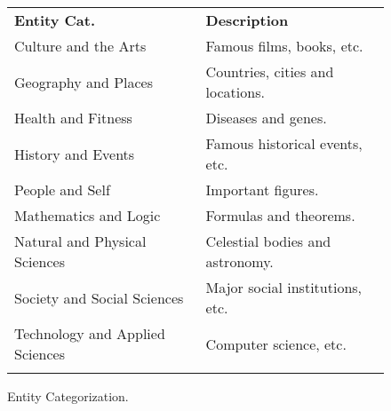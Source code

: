 

\begin{figure}[!b]
\vspace{-3mm}
\renewcommand{\arraystretch}{1.0}
\setlength{\tabcolsep}{2pt}
\footnotesize 
\begin{tabular}{l | l }
\Xhline{1.0\arrayrulewidth}
\textbf{Entity Cat.} & \textbf{Description}\\
        \Xhline{\arrayrulewidth}
        {Culture and the Arts} & Famous films, books, etc.\\ 
        {Geography and Places} & Countries, cities and locations. \\
        {Health and Fitness} & Diseases and genes. \\
        {History and Events} & Famous historical events, etc. \\
        {People and Self} & Important figures. \\
        {Mathematics and Logic} & Formulas and theorems. \\
        {Natural and Physical Sciences} & Celestial bodies and astronomy. \\
        {Society and Social Sciences} & Major social institutions, etc.\\ 
        {Technology and Applied Sciences} & Computer science, etc. \\
        \Xhline{1.5\arrayrulewidth} %
    \end{tabular}
\caption{{Entity Categorization.}}
\label{table:categories}
\end{figure}


